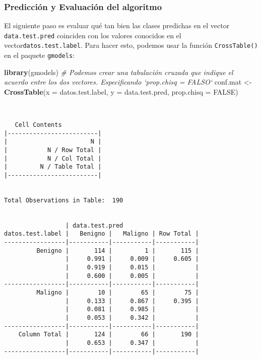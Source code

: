 \documentclass[
]{article}
\newenvironment{Shaded}{\begin{snugshade}}{\end{snugshade}}
\newcommand{\CommentTok}[1]{\textcolor[rgb]{0.56,0.35,0.01}{\textit{#1}}}
\newcommand{\DataTypeTok}[1]{\textcolor[rgb]{0.13,0.29,0.53}{#1}}
\newcommand{\KeywordTok}[1]{\textcolor[rgb]{0.13,0.29,0.53}{\textbf{#1}}}
\newcommand{\NormalTok}[1]{#1}
\newcommand{\OtherTok}[1]{\textcolor[rgb]{0.56,0.35,0.01}{#1}}
\newcommand{\StringTok}[1]{\textcolor[rgb]{0.31,0.60,0.02}{#1}}
\begin{document}
\hypertarget{predicciuxf3n-y-evaluaciuxf3n-del-algoritmo}{%
\subsubsection{Predicción y Evaluación del
algoritmo}\label{predicciuxf3n-y-evaluaciuxf3n-del-algoritmo}}

El siguiente paso es evaluar qué tan bien las clases predichas en el
vector \texttt{data.test.pred} coinciden con los valores conocidos en el
vector\texttt{datos.test.label}. Para hacer esto, podemos usar la
función \texttt{CrossTable()} en el paquete \texttt{gmodels}:

\begin{Shaded}
\begin{Highlighting}[]
\KeywordTok{library}\NormalTok{(gmodels)}
\CommentTok{# Podemos crear una tabulación cruzada que indique el acuerdo entre los dos vectores. Especificando `prop.chisq = FALSO`}
\NormalTok{conf.mat <-}\StringTok{ }\KeywordTok{CrossTable}\NormalTok{(}\DataTypeTok{x =}\NormalTok{ datos.test.label, }\DataTypeTok{y =}\NormalTok{ data.test.pred,}
           \DataTypeTok{prop.chisq =} \OtherTok{FALSE}\NormalTok{)}
\end{Highlighting}
\end{Shaded}

\begin{verbatim}

 
   Cell Contents
|-------------------------|
|                       N |
|           N / Row Total |
|           N / Col Total |
|         N / Table Total |
|-------------------------|

 
Total Observations in Table:  190 

 
                 | data.test.pred 
datos.test.label |   Benigno |   Maligno | Row Total | 
-----------------|-----------|-----------|-----------|
         Benigno |       114 |         1 |       115 | 
                 |     0.991 |     0.009 |     0.605 | 
                 |     0.919 |     0.015 |           | 
                 |     0.600 |     0.005 |           | 
-----------------|-----------|-----------|-----------|
         Maligno |        10 |        65 |        75 | 
                 |     0.133 |     0.867 |     0.395 | 
                 |     0.081 |     0.985 |           | 
                 |     0.053 |     0.342 |           | 
-----------------|-----------|-----------|-----------|
    Column Total |       124 |        66 |       190 | 
                 |     0.653 |     0.347 |           | 
-----------------|-----------|-----------|-----------|

 
\end{verbatim}
\end{document}
